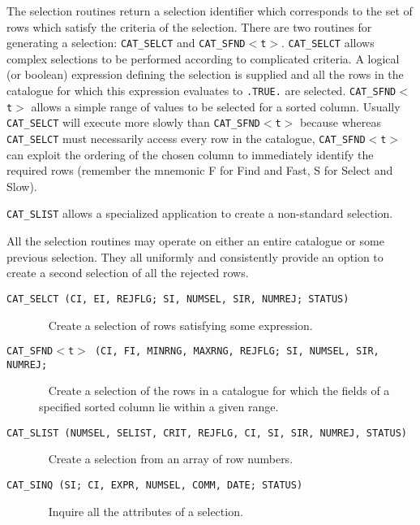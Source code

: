The selection routines return a selection identifier which corresponds
to the set of rows which satisfy the criteria of the selection. There
are two routines for generating a selection: {\tt CAT\_SELCT} and
{\tt CAT\_SFND$<$t$>$}. {\tt CAT\_SELCT} allows complex selections to be
performed according to complicated criteria. A logical (or boolean)
expression defining the selection is supplied and all the rows in the
catalogue for which this expression evaluates to {\tt .TRUE.} are
selected. {\tt CAT\_SFND$<$t$>$} allows a simple range of values to be
selected for a sorted column. Usually {\tt CAT\_SELCT} will execute
more slowly than {\tt CAT\_SFND$<$t$>$} because whereas {\tt
CAT\_SELCT} must necessarily access every row in the catalogue,
{\tt CAT\_SFND$<$t$>$} can exploit the ordering of the chosen column to
immediately identify the required rows (remember the mnemonic F for
Find and Fast, S for Select and Slow).

{\tt CAT\_SLIST} allows a specialized application to create a non-standard
selection.

All the selection routines may operate on either an entire catalogue
or some previous selection. They all uniformly and consistently
provide an option to create a second selection of all the rejected rows.

\begin{description}

  \item[ {\tt CAT\_SELCT (CI, EI, REJFLG; SI, NUMSEL, SIR, NUMREJ;
   STATUS) } ] ~
  \newline Create a selection of rows satisfying some expression.

  \item[ {\tt CAT\_SFND$<$t$>$ (CI, FI, MINRNG, MAXRNG, REJFLG; SI,
   NUMSEL, SIR, NUMREJ; } ] ~
  \newline Create a selection of the rows in a catalogue for which the
   fields of a specified sorted column lie within a given range.

  \item[ {\tt CAT\_SLIST (NUMSEL, SELIST, CRIT, REJFLG, CI, SI, SIR,
   NUMREJ, STATUS) } ] ~
  \newline Create a selection from an array of row numbers.

  \item[ {\tt CAT\_SINQ (SI; CI, EXPR, NUMSEL, COMM, DATE; STATUS) } ] ~
  \newline Inquire all the attributes of a selection.

\end{description}

